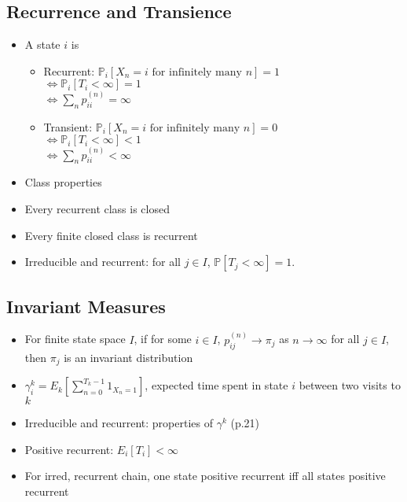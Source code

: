 \subsection*{Recurrence and Transience}
\begin{itemize}
    \item A state $i$ is
          \begin{itemize}
              \item Recurrent:
                    $\mathbb{P}_i[X_n=i \text{ for infinitely many } n] =1$ \\
                    $\iff \mathbb{P}_i[T_i<\infty]=1$ \\
                    $\iff \sum_n p_{ii}^{(n)} = \infty$
              \item Transient:
                    $\mathbb{P}_i[X_n=i \text{ for infinitely many } n] =0$ \\
                    $\iff \mathbb{P}_i[T_i<\infty] < 1$ \\
                    $\iff \sum_n p_{ii}^{(n)} < \infty$
          \end{itemize}
    \item Class properties
    \item Every recurrent class is closed
    \item Every finite closed class is recurrent
    \item Irreducible and recurrent: for all $j \in I$, $\mathbb{P}[T_j < \infty]=1$.
\end{itemize}

\subsection*{Invariant Measures}
\begin{itemize}
    \item For finite state space $I$, if for some $i\in I$, $p^{(n)}_{ij} \to \pi_j$ as $n \to \infty$ for all $j \in I$, then $\pi_j$ is an invariant distribution
    \item $\gamma_i^k = E_k\left[\sum_{n=0}^{T_k-1}1_{X_n=1}\right]$, expected time spent in state $i$ between two visits to $k$
    \item Irreducible and recurrent: properties of $\gamma^k$ (p.21)
    \item Positive recurrent: $E_i[T_i] < \infty $
    \item For irred, recurrent chain, one state positive recurrent iff all states positive recurrent
\end{itemize}
   
